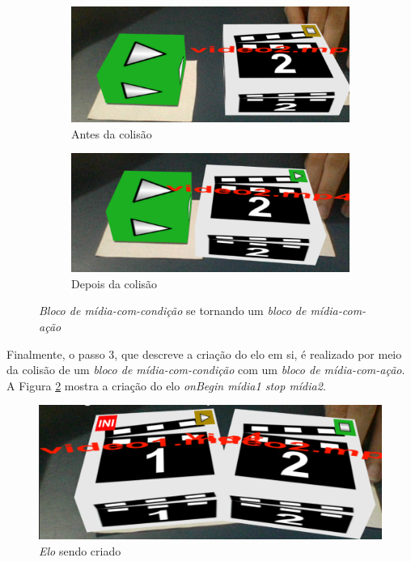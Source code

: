 \documentclass[../main.tex]{subfiles}
\begin{document}
\begin{figure}[!ht]
\centering
  \begin{subfigure}{0.49\linewidth}
    \includegraphics[width=0.95\linewidth]{IMG/beforeChangeR.png}
    \caption{Antes da colisão}
  \end{subfigure}
  \begin{subfigure}{0.49\linewidth}
    \includegraphics[width=0.95\linewidth]{IMG/afterChangeR.png}
    \caption{Depois da colisão}
  \end{subfigure}
\caption{\textit{Bloco de mídia-com-condição} se tornando um \textit{bloco de mídia-com-ação}}
\label{fig:mudando_papel}
\end{figure}

Finalmente, o passo 3, que descreve a criação do elo em si, é realizado por meio da colisão de um \emph{bloco de mídia-com-condição} com um \emph{bloco de mídia-com-ação}. A Figura \ref{fig:link} mostra a criação do elo \emph{onBegin mídia1 stop mídia2}.

\begin{figure}[!ht]
\centering
\includegraphics[width=0.6\linewidth]{IMG/linkR.png}
\caption{\textit{Elo} sendo criado}
\label{fig:link}
\end{figure}
\end{document}
